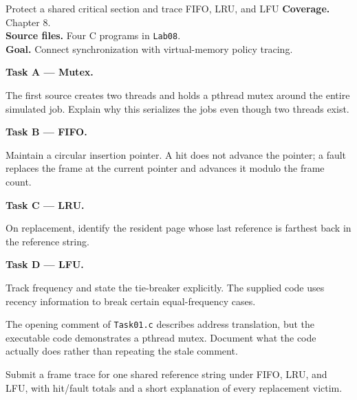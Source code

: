 \begin{labproject}{Protect a shared critical section and trace FIFO, LRU, and LFU}
\textbf{Coverage.} Chapter 8.\\
\textbf{Source files.} Four C programs in \texttt{Lab08}.\\
\textbf{Goal.} Connect synchronization with virtual-memory policy tracing.

\medskip\noindent\textbf{Task A --- Mutex.}\par
The first source creates two threads and holds a pthread mutex around the entire simulated job. Explain why this serializes the jobs even though two threads exist.

\medskip\noindent\textbf{Task B --- FIFO.}\par
Maintain a circular insertion pointer. A hit does not advance the pointer; a fault replaces the frame at the current pointer and advances it modulo the frame count.

\medskip\noindent\textbf{Task C --- LRU.}\par
On replacement, identify the resident page whose last reference is farthest back in the reference string.

\medskip\noindent\textbf{Task D --- LFU.}\par
Track frequency and state the tie-breaker explicitly. The supplied code uses recency information to break certain equal-frequency cases.

\begin{debugtask}
The opening comment of \texttt{Task01.c} describes address translation, but the executable code demonstrates a pthread mutex. Document what the code actually does rather than repeating the stale comment.
\end{debugtask}
\end{labproject}

\begin{labdeliverable}
Submit a frame trace for one shared reference string under FIFO, LRU, and LFU, with hit/fault totals and a short explanation of every replacement victim.
\end{labdeliverable}
